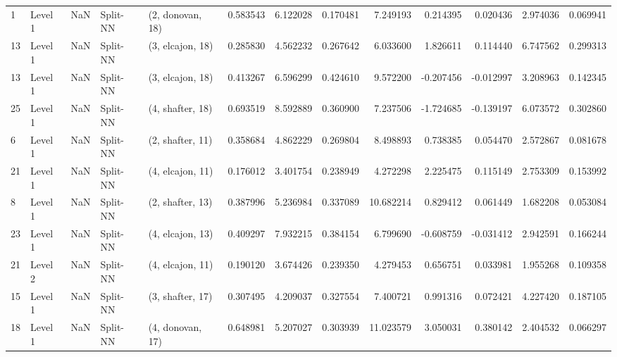 \begin{tabular}{llrllrrrrrrrr}
1  &   Level 1 &    NaN &       Split-NN &  (2, donovan, 18) &   0.583543 &   6.122028 &  0.170481 &   7.249193 &             0.214395 &               0.020436 &            2.974036 &              0.069941 \\
13 &   Level 1 &    NaN &       Split-NN &  (3, elcajon, 18) &   0.285830 &   4.562232 &  0.267642 &   6.033600 &             1.826611 &               0.114440 &            6.747562 &              0.299313 \\
13 &   Level 1 &    NaN &       Split-NN &  (3, elcajon, 18) &   0.413267 &   6.596299 &  0.424610 &   9.572200 &            -0.207456 &              -0.012997 &            3.208963 &              0.142345 \\
25 &   Level 1 &    NaN &       Split-NN &  (4, shafter, 18) &   0.693519 &   8.592889 &  0.360900 &   7.237506 &            -1.724685 &              -0.139197 &            6.073572 &              0.302860 \\
6  &   Level 1 &    NaN &       Split-NN &  (2, shafter, 11) &   0.358684 &   4.862229 &  0.269804 &   8.498893 &             0.738385 &               0.054470 &            2.572867 &              0.081678 \\
21 &   Level 1 &    NaN &       Split-NN &  (4, elcajon, 11) &   0.176012 &   3.401754 &  0.238949 &   4.272298 &             2.225475 &               0.115149 &            2.753309 &              0.153992 \\
8  &   Level 1 &    NaN &       Split-NN &  (2, shafter, 13) &   0.387996 &   5.236984 &  0.337089 &  10.682214 &             0.829412 &               0.061449 &            1.682208 &              0.053084 \\
23 &   Level 1 &    NaN &       Split-NN &  (4, elcajon, 13) &   0.409297 &   7.932215 &  0.384154 &   6.799690 &            -0.608759 &              -0.031412 &            2.942591 &              0.166244 \\
21 &   Level 2 &    NaN &       Split-NN &  (4, elcajon, 11) &   0.190120 &   3.674426 &  0.239350 &   4.279453 &             0.656751 &               0.033981 &            1.955268 &              0.109358 \\
15 &   Level 1 &    NaN &       Split-NN &  (3, shafter, 17) &   0.307495 &   4.209037 &  0.327554 &   7.400721 &             0.991316 &               0.072421 &            4.227420 &              0.187105 \\
18 &   Level 1 &    NaN &       Split-NN &  (4, donovan, 17) &   0.648981 &   5.207027 &  0.303939 &  11.023579 &             3.050031 &               0.380142 &            2.404532 &              0.066297 \\

\end{tabular}
